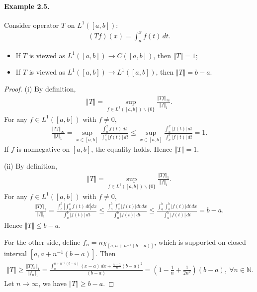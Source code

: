 \documentclass{article}
\begin{document}
\paragraph{Example 2.5.\label{example:2.5}} Consider operator $T$ on $L^1([a,b])$:
\begin{align*}
	(Tf)(x) = \int_a^x f(t)\,dt.
\end{align*}
\begin{itemize}
	\item[(i)] If $T$ is viewed as $L^1([a,b])\to C([a,b])$, then $\Vert T\Vert = 1$;
	\item[(ii)] If $T$ is viewed as $L^1([a,b])\to L^1([a,b])$, then $\Vert T\Vert = b-a$.
\end{itemize}
\begin{proof}
(i) By definition,
\begin{align*}
	\Vert T\Vert = \sup_{f\in L^1([a,b])\backslash\{0\}}\frac{\Vert Tf\Vert_\infty}{\Vert f\Vert_1}.
\end{align*}
For any $f\in L^1([a,b])$ with $f\neq 0$,
\begin{align*}
	\frac{\Vert Tf\Vert_\infty}{\Vert f\Vert_1} = \sup_{x\in[a,b]}\frac{\int_a^x f(t)\,dt}{\int_a^b \vert f(t)\vert\,dt}\leq \sup_{x\in[a,b]}\frac{\int_a^x \vert f(t)\vert\,dt}{\int_a^b \vert f(t)\vert\,dt}= 1.
\end{align*}
If $f$ is nonnegative on $[a,b]$, the equality holds. Hence $\Vert T\Vert = 1$.
\vspace{0.1cm}

(ii) By definition,
\begin{align*}
	\Vert T\Vert = \sup_{f\in L^1([a,b])\backslash\{0\}}\frac{\Vert Tf\Vert_1}{\Vert f\Vert_1}.
\end{align*}
For any $f\in L^1([a,b])$ with $f\neq 0$,
\begin{align*}
	\frac{\Vert Tf\Vert_1}{\Vert f\Vert_1} = \frac{\int_a^b\left\vert\int_a^x f(t)\,dt\right\vert dx}{\int_a^b \vert f(t)\vert\,dt}\leq \frac{\int_a^b\int_a^x \left\vert f(t)\right\vert dt\,dx}{\int_a^b \vert f(t)\vert\,dt}\leq  \frac{\int_a^b\int_a^b \left\vert f(t)\right\vert dt\,dx}{\int_a^b \vert f(t)\vert\,dt} = b-a.
\end{align*}
Hence $\Vert T\Vert \leq b-a$.
\vspace{0.1cm}

For the other side, define $f_n = n\chi_{[a,a+n^{-1}(b-a)]}$, which is supported on closed interval $[a,a+n^{-1}(b-a)]$. Then
\begin{align*}
	\Vert T\Vert \geq \frac{\Vert Tf_n\Vert_1}{\Vert f_n\Vert_1} = \frac{\int_a^{a+n^{-1}(b-a)} (x-a)\,dx + \frac{n-1}{n}(b-a)^2}{(b-a)} = \left(1 - \frac{1}{n} + \frac{1}{2n^2}\right)(b-a),\ \forall n\in\mathbb{N}.
\end{align*}
Let $n\to\infty$, we have $\Vert T\Vert \geq b-a$. 
\end{proof}
\end{document}
